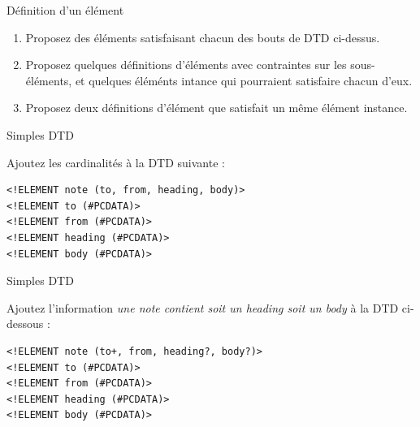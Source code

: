 \begin{frame}{Définition d'un élément}
\begin{itemize}
\begin{minipage}{0.9\textwidth}
\begin{exoblock}%
\begin{enumerate}
\item Proposez des éléments satisfaisant chacun des bouts de DTD ci-dessus.
\item Proposez quelques définitions d'éléments avec contraintes sur les sous-éléments, et quelques éléménts intance qui pourraient satisfaire chacun d'eux.
\item Proposez deux définitions d'élément que satisfait un même élément instance.
\end{enumerate}
\end{exoblock}
\end{minipage}

\end{itemize}


\end{frame}


\begin{frame}[containsverbatim]{Simples DTD}

\begin{exoblock}%
Ajoutez les cardinalités à la DTD suivante :
\begin{lstlisting}
<!ELEMENT note (to, from, heading, body)>
<!ELEMENT to (#PCDATA)>
<!ELEMENT from (#PCDATA)>
<!ELEMENT heading (#PCDATA)>
<!ELEMENT body (#PCDATA)>
\end{lstlisting}
\end{exoblock}

\end{frame}



\begin{frame}[containsverbatim]{Simples DTD}

\begin{exoblock}%
Ajoutez l'information
\textit{une note contient soit un heading soit un body} à la DTD ci-dessous :
\begin{lstlisting}[caption={Le memo}]
<!ELEMENT note (to+, from, heading?, body?)>
<!ELEMENT to (#PCDATA)>
<!ELEMENT from (#PCDATA)>
<!ELEMENT heading (#PCDATA)>
<!ELEMENT body (#PCDATA)>
\end{lstlisting}
\end{exoblock}


\end{frame}


